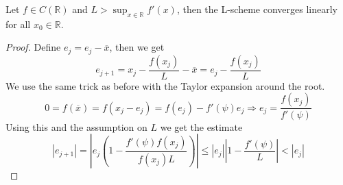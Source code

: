 \documentclass[../Main/main.tex]{subfiles}
\begin{document}
\begin{theorem}
	Let $f\in C(\mathbb{R})$ and $L>\sup_{x\in\mathbb{R}}f'(x)$, then the L-scheme converges linearly for all $x_0\in \mathbb{R}$.
\end{theorem}
\begin{proof}
	Define $e_j = e_j-\overline{x}$, then we get
	\begin{equation}
		e_{j+1} = x_j-\frac{f(x_j)}{L}-\overline{x}=e_j-\frac{f(x_j)}{L}
	\end{equation}
	We use the same trick as before with the Taylor expansion around the root.
	\begin{equation}
		0 = f(\overline{x}) = f(x_j-e_j) = f(e_j)-f'(\psi)e_j\Rightarrow e_j = \frac{f(x_j)}{f'(\psi)}
	\end{equation}
	Using this and the assumption on $L$ we get the estimate
	\begin{equation}
		|e_{j+1}|=|e_j(1-\frac{f'(\psi)f(x_j)}{f(x_j)L})|\leq|e_j||1-\frac{f'(\psi)}{L}|<|e_j|
	\end{equation}
\end{proof}
\end{document}
